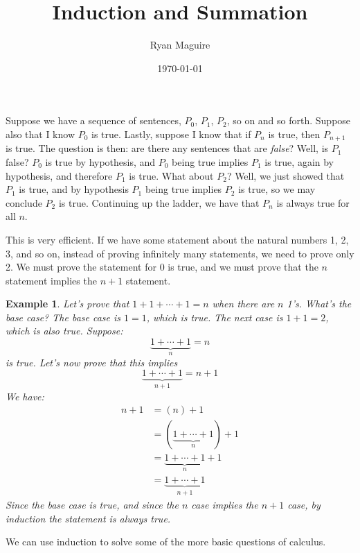 \documentclass{article}
\title{Induction and Summation}
\author{Ryan Maguire}
\date{\today}
\theoremstyle{normal}
\newtheorem{example}{Example}
\begin{document}
    \maketitle
    Suppose we have a sequence of sentences, $P_{0}$, $P_{1}$, $P_{2}$, so on
    and so forth. Suppose also that I know $P_{0}$ is true. Lastly, suppose I
    know that if $P_{n}$ is true, then $P_{n+1}$ is true. The question is then:
    are there any sentences that are \textit{false}? Well, is $P_{1}$ false?
    $P_{0}$ is true by hypothesis, and $P_{0}$ being true implies $P_{1}$ is
    true, again by hypothesis, and therefore $P_{1}$ is true. What about
    $P_{2}$? Well, we just showed that $P_{1}$ is true, and by hypothesis
    $P_{1}$ being true implies $P_{2}$ is true, so we may conclude $P_{2}$ is
    true. Continuing up the ladder, we have that $P_{n}$ is always
    true for all $n$.
    \par\hfill\par
    This is very efficient. If we have some statement about the natural numbers
    1, 2, 3, and so on, instead of proving infinitely many statements, we need
    to prove only 2. We must prove the statement for 0 is true, and we must
    prove that the $n$ statement implies the $n+1$ statement.
    \begin{example}
        Let's prove that $1+1+\cdots+1=n$ when there are $n$ 1's. What's the
        base case? The base case is $1=1$, which is true. The next case is
        $1+1=2$, which is also true. Suppose:
        \begin{equation}
            \underbrace{1+\cdots+1}_{n}=n
        \end{equation}
        is true. Let's now prove that this implies
        \begin{equation}
            \underbrace{1+\cdots+1}_{n+1}=n+1
        \end{equation}
        We have:
        \begin{align}
            n+1
            &=(n)+1\\
            &=(\underbrace{1+\cdots+1}_{n})+1\\
            &=\underbrace{1+\cdots+1}_{n}+1\\
            &=\underbrace{1+\cdots+1}_{n+1}
        \end{align}
        Since the base case is true, and since the $n$ case implies the
        $n+1$ case, by induction the statement is always true.
    \end{example}
    \newpage
    We can use induction to solve some of the more basic questions of calculus.
\end{document}
